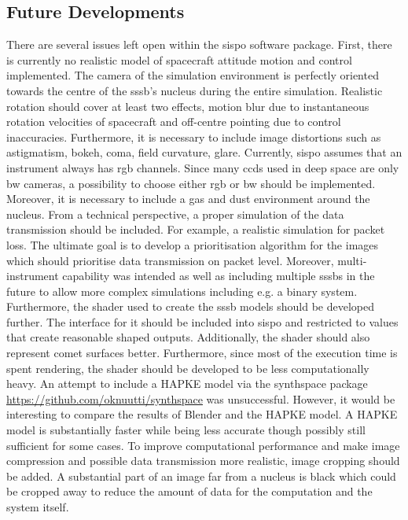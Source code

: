 \subsection{Future Developments}
There are several issues left open within the \gls{sispo} software package. First, there is currently no realistic model of spacecraft attitude motion and control implemented. The camera of the simulation environment is perfectly oriented towards the centre of the \gls{sssb}'s nucleus during the entire simulation. Realistic rotation should cover at least two effects, motion blur due to instantaneous rotation velocities of spacecraft and off-centre pointing due to control inaccuracies. Furthermore, it is necessary to include  image distortions such as astigmatism, bokeh, coma, field curvature, glare.
Currently, \gls{sispo} assumes that an instrument always has \gls{rgb} channels. Since many \gls{ccd}s used in deep space are only \gls{bw} cameras, a possibility to choose either \gls{rgb} or \gls{bw} should be implemented.
Moreover, it is necessary to include a gas and dust environment around the nucleus. From a technical perspective, a proper simulation of the data transmission should be included. For example, a realistic simulation for packet loss. The ultimate goal is to develop a prioritisation algorithm for the images which should prioritise data transmission on packet level.
Moreover, multi-instrument capability was intended as well as including multiple \gls{sssb}s in the future to allow more complex simulations including e.g. a binary system.
Furthermore, the shader used to create the \gls{sssb} models should be developed further. The interface for it should be included into \gls{sispo} and restricted to values that create reasonable shaped outputs. Additionally, the shader should also represent comet surfaces better. Furthermore, since most of the execution time is spent rendering, the shader should be developed to be less computationally heavy.
An attempt to include a HAPKE model via the synthspace package \url{https://github.com/oknuutti/synthspace} was unsuccessful. However, it would be interesting to compare the results of Blender and the HAPKE model. A HAPKE model is substantially faster while being less accurate though possibly still sufficient for some cases.
To improve computational performance and make image compression and possible data transmission more realistic, image cropping should be added. A substantial part of an image far from a nucleus is black which could be cropped away to reduce the amount of data for the computation and the system itself.